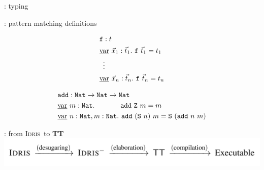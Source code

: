 \documentclass{beamer}
\newcommand\Idris{\textsc{Idris}}
\begin{document}
\begin{frame}{\typetheory: typing}
		
		\begin{prooftree}
		\end{prooftree}
	\end{frame}
	
	\newcommand\ttvar{\text{\underline{var}}}
	
	\begin{frame}{\typetheory: pattern matching definitions}
		
		\begin{align*}
			&\texttt{f} : t \\
			&\ttvar\ \vec{x}_1 : \vec{t}_1.\ \texttt{f}\ \vec{t}_1 = t_1 \\
			&\, \ \vdots \\
			&\ttvar\ \vec{x}_n : \vec{t}_n.\ \texttt{f}\ \vec{t}_n = t_n \\
		\end{align*}
		
		\pause
		
		\begin{align*}
			&\texttt{add} : \texttt{Nat} \to \texttt{Nat} \to \texttt{Nat} \\
			&\ttvar\ m : \texttt{Nat}.\ \quad \quad \quad \ \texttt{add}\ \texttt{Z}\ m = m \\
			&\ttvar\ n : \texttt{Nat}, m : \texttt{Nat}.\ \texttt{add}\ (\texttt{S}\ n)\ m = \texttt{S}\ (\texttt{add}\ n\ m) \\
		\end{align*}
		
	\end{frame}
	
	\begin{frame}{\typetheory: from \Idris\ to \textbf{TT}}
		\includegraphics[width=\textwidth]{pics/phases}
	\end{frame}
	
\end{document}
